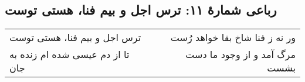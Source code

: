 \begin{center}
\section*{رباعی شمارهٔ ۱۱: ترس اجل و بیم فنا، هستی توست}
\label{sec:011}
\begin{longtable}{l p{0.5cm} r}
ترس اجل و بیم فنا، هستی توست
&&
ور نه ز فنا شاخ بقا خواهد رُست
\\
تا از دم عیسی شده ام زنده به جان
&&
مرگ آمد و از وجود ما دست بشست
\\
\end{longtable}
\end{center}
